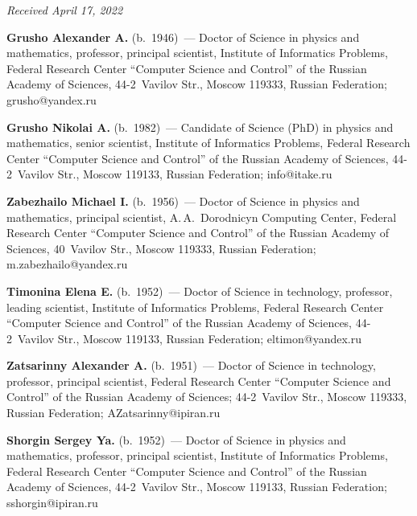 \vspace*{-7pt}

\hfill{\small\textit{Received April 17, 2022}}

\vspace*{-22pt}

\Contr

\vspace*{-3pt}

\noindent
\textbf{Grusho Alexander A.} (b.\ 1946)~--- Doctor of Science in physics and mathematics, professor, 
principal scientist, Institute of Informatics Problems, Federal Research Center ``Computer Science and 
Control'' of the Russian Academy of Sciences, 44-2~Vavilov Str., Moscow 119333, Russian 
Federation; \mbox{grusho@yandex.ru}

\vspace*{3pt}

\noindent
\textbf{Grusho Nikolai A.} (b.\ 1982)~--- Candidate of Science (PhD) in physics and mathematics, 
senior scientist, Institute of Informatics Problems, Federal Research Center ``Computer Science and 
Control'' of the Russian Academy of Sciences, 44-2~Vavilov Str., Moscow 119133, Russian 
Federation; \mbox{info@itake.ru}

\pagebreak

\noindent
\textbf{Zabezhailo Michael I.} (b.\ 1956)~--- Doctor of Science in physics and mathematics, principal 
scientist, A.\,A.~Dorodnicyn Computing Center, Federal Research Center ``Computer Science and 
Control'' of the Russian Academy of Sciences, 40~Vavilov Str., Moscow 119333, Russian Federation; 
\mbox{m.zabezhailo@yandex.ru}

\vspace*{3pt}

\noindent
\textbf{Timonina Elena E.} (b.\ 1952)~--- Doctor of Science in technology, professor, leading scientist, 
Institute of Informatics Problems, Federal Research Center ``Computer Science and Control'' of the 
Russian Academy of Sciences, 44-2~Vavilov Str., Moscow 119133, Russian Federation; 
\mbox{eltimon@yandex.ru}

\vspace*{3pt}

\noindent
\textbf{Zatsarinny Alexander A.} (b.\ 1951)~--- Doctor of Science in technology, professor, principal 
scientist, Federal Research Center ``Computer Science and Control'' of the Russian Academy of 
Sciences; 44-2~Vavilov Str., Moscow 119333, Russian Federation; \mbox{AZatsarinny@ipiran.ru}

\vspace*{3pt}

\noindent
\textbf{Shorgin Sergey Ya.} (b.\ 1952)~--- Doctor of Science in physics and mathematics, professor, 
principal scientist, Institute of Informatics Problems, Federal Research Center ``Computer Science and 
Control'' of the Russian Academy of Sciences, 44-2~Vavilov Str., Moscow 119133, Russian 
Federation; \mbox{sshorgin@ipiran.ru}

   

\label{end\stat}

\renewcommand{\bibname}{\protect\rm Литература}    